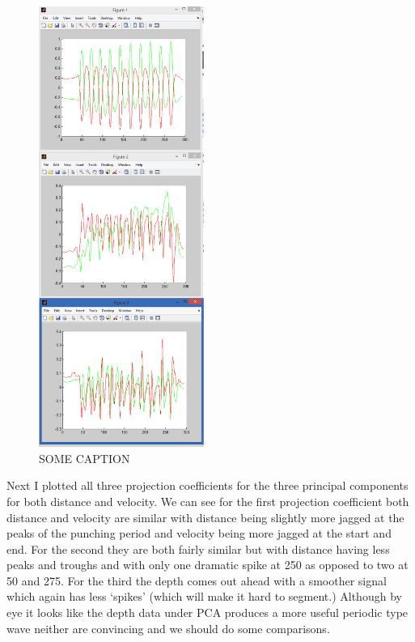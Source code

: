 \begin{figure}
\begin{center}
    \includegraphics[width=0.48\textwidth]{fig04/3pcs.png}
    \caption{SOME CAPTION}
    \label{fig:WHAT}
\end{center}
\end{figure}
Next I plotted all three projection coefficients for the three principal components for both distance and velocity. We can see for the first projection coefficient both distance and velocity are similar with distance being slightly more jagged at the peaks of the punching period and velocity being more jagged at the start and end.
For the second they are both fairly similar but with distance having less peaks and troughs and with only one dramatic spike at 250 as opposed to two at 50 and 275.
For the third the depth comes out ahead with a smoother signal which again has less `spikes' (which will make it hard to segment.) Although by eye it looks like the depth data under PCA produces a more useful periodic type wave neither are convincing and we should do some comparisons.


